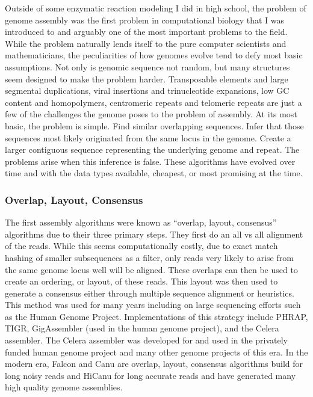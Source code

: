 \par{
Outside of some enzymatic reaction modeling I did in high school, the problem of genome assembly was the first problem in computational biology that I was introduced to and arguably one of the most important problems to the field. While the problem naturally lends itself to the pure computer scientists and mathematicians, the peculiarities of how genomes evolve tend to defy most basic assumptions. Not only is genomic sequence not random, but many structures seem designed to make the problem harder. Transposable elements and large segmental duplications, viral insertions and trinucleotide expansions, low GC content and homopolymers, centromeric repeats and telomeric repeats are just a few of the challenges the genome poses to the problem of assembly. At its most basic, the problem is simple. Find similar overlapping sequences. Infer that those sequences most likely originated from the same locus in the genome. Create a larger contiguous sequence representing the underlying genome and repeat. The problems arise when this inference is false. These algorithms have evolved over time and with the data types available, cheapest, or most promising at the time.
}
\subsubsection{Overlap, Layout, Consensus}

\par{
The first assembly algorithms were known as ``overlap, layout, consensus'' algorithms due to their three primary steps. They first do an all vs all alignment of the reads. While this seems computationally costly, due to exact match hashing of smaller subsequences as a filter, only reads very likely to arise from the same genome locus well will be aligned\cite{OLC}. These overlaps can then be used to create an ordering, or layout, of these reads. This layout was then used to generate a consensus either through multiple sequence alignment or heuristics\cite{gene1}. This method was used for many years including on large sequencing efforts such as the Human Genome Project\cite{genomeproject}. Implementations of this strategy include PHRAP\cite{phrap}, TIGR\cite{tigr}, GigAssembler\cite{gigassembler} (used in the human genome project), and the Celera assembler\cite{Myers2000}. The Celera assembler was developed for and used in the privately funded human genome project\cite{privategenome} and many other genome projects of this era. In the modern era, Falcon and Canu are overlap, layout, consensus algorithms build for long noisy reads\cite{falcon}\cite{canu} and HiCanu for long accurate reads\cite{HICANU} and have generated many high quality genome assemblies\cite{singlemosquito}.
}


